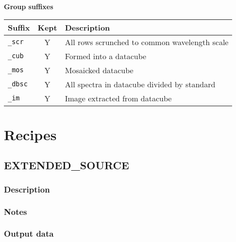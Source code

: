\documentclass[twoside,11pt,nolof]{starlink}
\begin{document}
\vspace{0.5cm}

\textbf{Group suffixes}

\vspace{0.2cm}

\begin{tabular}{l c l}
\hline
Suffix & Kept & Description \hspace{9cm} \\
\hline
\texttt{\_scr} & Y & All rows scrunched to common wavelength scale\\
\texttt{\_cub} & Y & Formed into a datacube\\
\texttt{\_mos} & Y & Mosaicked datacube\\
\texttt{\_dbsc} & Y & All spectra in datacube divided by standard\\
\texttt{\_im}  & Y & Image extracted from datacube\\
\hline
\end{tabular}

\clearpage


\section{Recipes}

\subsection{EXTENDED\_SOURCE}

\subsubsection*{Description}

\subsubsection*{Notes}

\subsubsection*{Output data}

\clearpage
\end{document}
